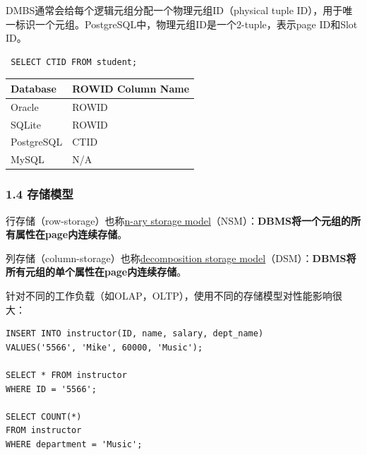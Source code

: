 \documentclass[aspectratio=169, 14pt]{beamer}
\begin{document}
\begin{frame}[fragile]
	DMBS通常会给每个逻辑元组分配一个\alert{物理元组ID}（physical tuple ID），用于唯一标识一个元组。PostgreSQL中，物理元组ID是一个2-tuple，表示page ID和Slot ID。

	\begin{verbatim}
 SELECT CTID FROM student;
  \end{verbatim}


	\begin{table}[h!]
		\centering
		\begin{tabular}{|l|l|}
			\hline
			\textbf{Database} & \textbf{ROWID Column Name} \\
			\hline
			Oracle            & ROWID                      \\
			SQLite            & ROWID                      \\
			PostgreSQL        & CTID                       \\
			MySQL             & N/A                        \\
			\hline
		\end{tabular}
	\end{table}

\end{frame}

\begin{frame}[fragile]
	\frametitle{1.4 存储模型}


	\alert{行存储}（row-storage）也称\underline{n-ary storage model}（NSM）：\textbf{DBMS将一个元组的所有属性在page内连续存储}。

	\alert{列存储}（column-storage）也称\underline{decomposition storage model}（DSM）：\textbf{DBMS将所有元组的单个属性在page内连续存储}。

\end{frame}

\begin{frame}[fragile]

	针对不同的工作负载（如OLAP，OLTP），使用不同的存储模型对性能影响很大：

	\begin{verbatim}
INSERT INTO instructor(ID, name, salary, dept_name)
VALUES('5566', 'Mike', 60000, 'Music');

SELECT * FROM instructor
WHERE ID = '5566';

SELECT COUNT(*)
FROM instructor
WHERE department = 'Music';
\end{verbatim}

\end{frame}
\end{document}
